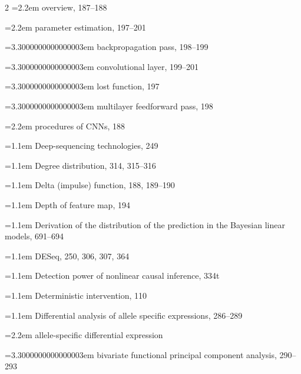 \begin{multicols}{2}
\noindent\hangindent=2.2em \hspace*{1.1em}overview, 187--188\par
\noindent\hangindent=2.2em \hspace*{1.1em}parameter estimation, 197--201\par
\noindent\hangindent=3.3000000000000003em \hspace*{2.2em}backpropagation pass, 198--199\par
\noindent\hangindent=3.3000000000000003em \hspace*{2.2em}convolutional layer, 199--201\par
\noindent\hangindent=3.3000000000000003em \hspace*{2.2em}lost function, 197\par
\noindent\hangindent=3.3000000000000003em \hspace*{2.2em}multilayer feedforward pass, 198\par
\noindent\hangindent=2.2em \hspace*{1.1em}procedures of CNNs, 188\par
\noindent\hangindent=1.1em Deep-sequencing technologies, 249\par
\noindent\hangindent=1.1em Degree distribution, 314, 315--316\par
\noindent\hangindent=1.1em Delta (impulse) function, 188, 189--190\par
\noindent\hangindent=1.1em Depth of feature map, 194\par
\noindent\hangindent=1.1em Derivation of the distribution of the prediction in the Bayesian linear models, 691--694\par
\noindent\hangindent=1.1em DESeq, 250, 306, 307, 364\par
\noindent\hangindent=1.1em Detection power of nonlinear causal inference, 334t\par
\noindent\hangindent=1.1em Deterministic intervention, 110\par
\noindent\hangindent=1.1em Differential analysis of allele specific expressions, 286--289\par
\noindent\hangindent=2.2em \hspace*{1.1em}allele-specific differential expression\par
\noindent\hangindent=3.3000000000000003em \hspace*{2.2em}bivariate functional principal component analysis, 290--293\par

\end{multicols}
